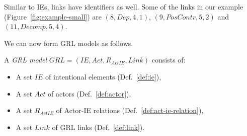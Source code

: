 

Similar to IEs, links have identifiers as well. Some of the links in our example (Figure~\ref{fig:example-small}) are $(8, Dep, 4, 1)$, $(9, PosContr, 5, 2)$ and $(11, Decomp, 5, 4)$.


We can now form GRL models as follows.

\begin{definition}
\label{def:grl-model}
A \emph{GRL model} $GRL=(IE, Act, R_{ActIE}, Link)$ consists of:
\begin{itemize}
\item A set $IE$ of intentional elements (Def.~\ref{def:ie}),
\item A set $Act$ of actors (Def.~\ref{def:actor}),
\item A set $R_{ActIE}$ of Actor-IE relations (Def.~\ref{def:act-ie-relation}),
\item A set $Link$ of GRL links (Def.~\ref{def:link}).
\end{itemize}
\end{definition}

